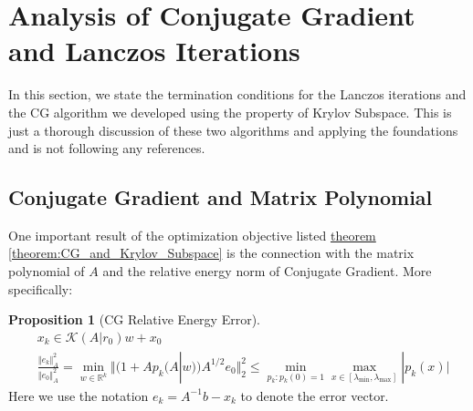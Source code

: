 \documentclass[]{article}
\theoremstyle{definition}
\newtheorem{prop}{Proposition}[section]  %
\begin{document}
\section{Analysis of Conjugate Gradient and Lanczos Iterations}
    In this section, we state the termination conditions for the Lanczos iterations and the CG algorithm we developed using the property of Krylov Subspace. This is just a thorough discussion of these two algorithms and applying the foundations and is not following any references.
    \subsection{Conjugate Gradient and Matrix Polynomial}
        One important result of the optimization objective listed \hyperref[theorem:CG_and_Krylov_Subspace]{theorem \ref*{theorem:CG_and_Krylov_Subspace}} is the connection with the matrix polynomial of $A$ and the relative energy norm of Conjugate Gradient. More  specifically:
        \begin{prop}[CG Relative Energy Error]\label{prop:CG_Relative_Energy Error}
            \begin{align}
                & x_k \in \mathcal{K}(A|r_0)w + x_0
                \\
                & \frac{\Vert e_k\Vert_A^2}{\Vert e_0\Vert_A^2}
                = 
                \min_{w\in \mathbb R^k} 
                \Vert
                    (1 + Ap_k(A|w))A^{1/2}e_0
                \Vert_2^2
                \le
                \min_{p_{k}: p_{k}(0) = 1}\max_{x\in [\lambda_{\text{min}}, \lambda_{\text{max}}
                ]} |p_k(x)|
            \end{align}
            Here we use the notation $e_k = A^{-1}b - x_k$ to denote the error vector. 
        \end{prop}
\end{document}
